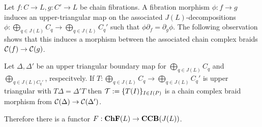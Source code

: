 %
%
%
%






%
%



Let $f:C\to L,g:C'\to L$ be chain fibrations.  A fibration morphism $\phi:f\to g$ induces an upper-triangular map on the associated $J(L)$-decompositions $\phi:\bigoplus_{q\in J(L)}C_q\to \bigoplus_{q\in J(L)} C_q'$ such that $\phi\partial_f = \partial_g\phi$.  The following observation shows that this induces a morphism between the associated chain complex braids ${\mathcal C}(f)\to {\mathcal C}(g)$.

\begin{prop}
Let $\Delta,\Delta'$ be an upper triangular boundary map for $\bigoplus_{q\in J(L)} C_q$ and $\bigoplus_{q\in J(L) C_q'}$, respecitvely.  If $T:\bigoplus_{q\in J(L)} C_q\to \bigoplus_{q\in J(L)} C_q'$ is upper triangular with $T\Delta = \Delta'T$ then ${\mathcal T}:=\{T(I)\}_{I\in I(P)}$ is a chain complex braid morphism from ${\mathcal C}(\Delta)\to {\mathcal C}(\Delta')$.
\end{prop}

Therefore there is a functor $F:{\bf ChF}(L)\to {\bf CCB}(J(L))$.


